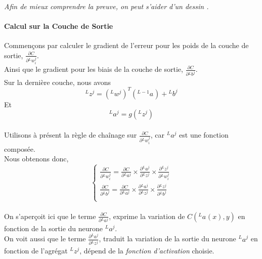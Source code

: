 \documentclass[10pt,a4paper]{report}
\newcommand{\lexp}[1]{\phantom{}^{#1}}
\newcommand{\elem}[4]{\lexp{#2}#1^{#3}_{#4}}
\begin{document}
				 \emph{\\Afin de mieux comprendre la preuve, on peut s'aider d'un dessin \smiley{}.}
				
				\paragraph{Calcul sur la Couche de Sortie}
				
				Commençons par calculer le gradient de l'erreur pour les poids de la couche de sortie, $\frac{\partial C}{\partial \elem{w}{L}{j}{i}}$.\\
				Ainsi que le gradient pour les biais de la couche de sortie, $\frac{\partial C}{\partial \elem{b}{L}{j}{}}$.\\
				Sur la dernière couche, nous avons
				$$\elem{z}{L}{j}{} = (\elem{w}{L}{j}{})^T(\elem{a}{L-1}{}{}) + \elem{b}{L}{j}{}$$
				Et
				$$\elem{a}{L}{j}{} = g(\elem{z}{L}{j}{})$$\\
				Utilisons à présent la règle de chaînage sur $\frac{\partial C}{\partial \elem{w}{L}{j}{i}}$, car $\elem{a}{L}{j}{}$ est une fonction composée.\\
				Nous obtenons donc,
				$$\left\{
				\begin{array}{l}
					\frac{\partial C}{\partial \elem{w}{L}{j}{i}} = \frac{\partial C}{\partial \elem{a}{L}{j}{}} \times \frac{\partial \elem{a}{L}{j}{}}{\partial \elem{z}{L}{j}{}} \times \frac{\partial \elem{z}{L}{j}{}}{\partial \elem{w}{L}{j}{i}}\\
					
					\frac{\partial C}{\partial \elem{b}{L}{j}{}} = \frac{\partial C}{\partial \elem{a}{L}{j}{}} \times \frac{\partial \elem{a}{L}{j}{}}{\partial \elem{z}{L}{j}{}} \times \frac{\partial \elem{z}{L}{j}{}}{\partial \elem{b}{L}{j}{}}\\
				\end{array}
				\right.$$\\
				
				On s'aperçoit ici que le terme $\frac{\partial C}{\partial \elem{a}{L}{j}{}}$, exprime la variation de $C(\elem{a}{L}{}{}(x),y)$ en fonction de la sortie du neurone $\elem{a}{L}{j}{}$.\\
				
				On voit aussi que le terme $\frac{\partial \elem{a}{L}{j}{}}{\partial \elem{z}{L}{j}{}}$, traduit la variation de la sortie du neurone $\elem{a}{L}{j}{}$ en fonction de l'agrégat $\elem{z}{L}{j}{}$, dépend de la \emph{fonction d'activation} choisie.\\
				
\end{document}
